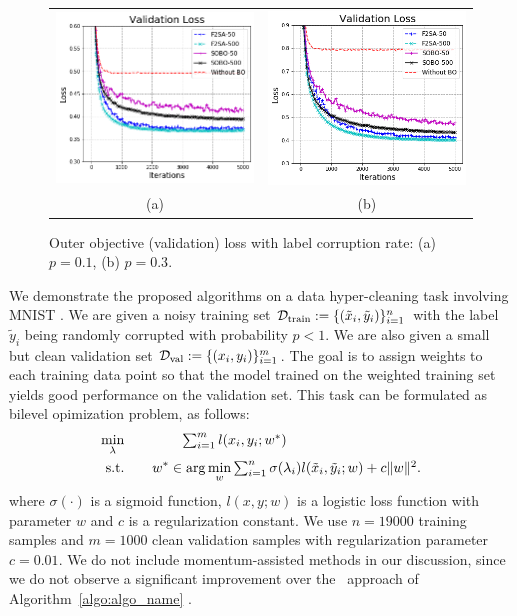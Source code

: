 

\begin{figure}[t]
    \centering
    \begin{tabular}{cc}
        \includegraphics[width=75mm]{Figures/corrupt=0.1.png} &
        \includegraphics[width=75mm]{Figures/corrupt=0.3.png} \\
        (a) & (b)
    \end{tabular}
    \caption{Outer objective (validation) loss with label corruption rate: (a) $p=0.1$, (b) $p=0.3$.}
    \label{fig:basic_experiment}
\end{figure}

We demonstrate the proposed algorithms on a data hyper-cleaning task involving MNIST \cite{deng2012mnist}.
We are given a noisy training set $\mathcal{D}_{\text{train}} := \{(\tilde{x}_i, \tilde{y}_i)\}_{i=1}^{n}$ with the label $\tilde{y}_i$ being randomly corrupted with probability $p < 1$. 
We are also given a small but clean validation set $\mathcal{D}_{\text{val}} := \{(x_i, y_i)\}_{i=1}^{m}$. 
The goal is to assign weights to each training data point so that the model trained on the weighted training set yields good performance on the validation set. 
This task can be formulated as bilevel opimization problem, as follows:
\begin{align*}
    \min_{\lambda} &\qquad \qquad   \textstyle \sum_{i=1}^m l(x_i, y_i; w^*) \\
    \text{s.t.}  &\qquad  w^* \in \arg \min_{w} \textstyle \sum_{i=1}^n \sigma(\lambda_i) l(\tilde{x}_i, \tilde{y}_i; w) + c \|w\|^2.  
\end{align*}
where $\sigma(\cdot)$ is a sigmoid function, $l(x,y;w)$ is a logistic loss function with parameter $w$ and $c$ is a regularization constant. We use $n=19000$ training samples and $m=1000$ clean validation samples with regularization parameter $c = 0.01$. 
We do not include momentum-assisted methods in our discussion, since we do not observe a significant improvement over the \algname \,
approach of Algorithm~\ref{algo:algo_name} .

